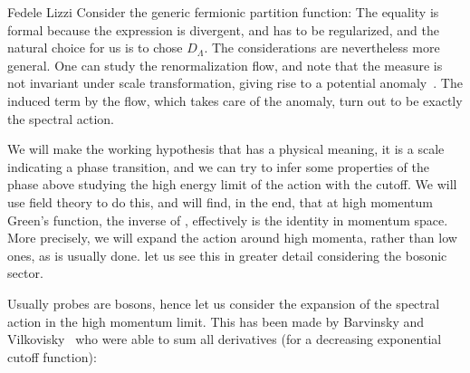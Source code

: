 \begin{artengenv}{Fedele Lizzi}
Consider the generic fermionic partition function:
 The equality is formal because the expression is divergent, and has to be regularized, and the natural choice for us is to chose $D_\Lambda$. The considerations are nevertheless more general. One can study the renormalization flow, and note that the measure is not invariant under scale transformation, giving rise to a potential anomaly~\cite{Andrianov:2010nr, Andrianov:2011bc}.
The induced term by the flow, which takes care of the anomaly, turn out to be exactly the spectral action.

We will make the working hypothesis that \formu{\Lambda} has a physical meaning, it is a scale indicating a phase transition, and we can try to infer some properties of the phase above \formu{\Lambda} studying the high energy limit of the action with the cutoff. We will use field theory to do this, and will find, in the end, that at high momentum Green's function, the inverse of , effectively is the identity in momentum space. More precisely, we will expand the action around high momenta, rather than low ones, as is usually done. let us see this in greater detail considering the bosonic sector.



Usually probes are bosons, hence let us consider the expansion of the spectral action in the high momentum limit.
This has been made by Barvinsky and Vilkovisky~\cite{Barvinsky:1990up} who were able to sum all derivatives (for a decreasing exponential cutoff function):


\end{artengenv}
